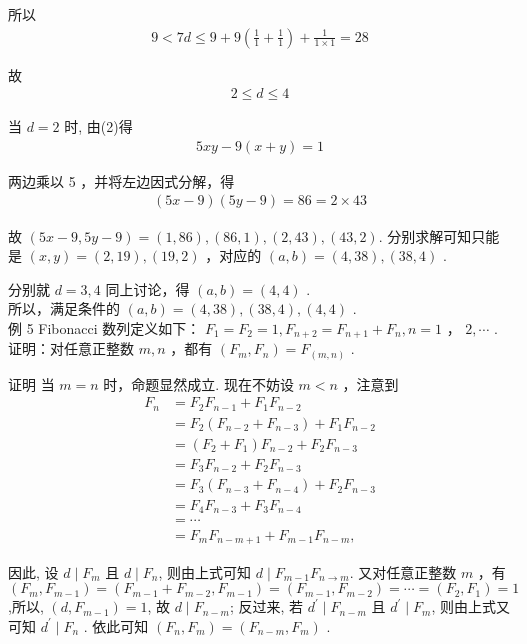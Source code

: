 所以\\
\begin{align*}
9<7 d \leqslant 9+9\left(\frac{1}{1}+\frac{1}{1}\right)+\frac{1}{1 \times 1}=28
\end{align*}

故\\
\begin{align*}
2 \leqslant d \leqslant 4
\end{align*}

当 $d=2$ 时, 由(2)得\\
\begin{align*}
5 x y-9(x+y)=1
\end{align*}

两边乘以 5 ，并将左边因式分解，得\\
\begin{align*}
(5 x-9)(5 y-9)=86=2 \times 43
\end{align*}

故 $(5 x-9,5 y-9)=(1,86) , (86,1),(2,43) , (43,2)$. 分别求解可知只能是 $(x, y)=(2,19),(19,2)$ ，对应的 $(a, b)=(4,38),(38,4)$ . 

分别就 $d=3,4$ 同上讨论，得 $(a, b)=(4,4)$ . \\
所以，满足条件的 $(a, b)=(4,38),(38,4),(4,4)$ . \\
例 5 Fibonacci 数列定义如下： $F_{1}=F_{2}=1, F_{n+2}=F_{n+1}+F_{n}, n=1$ ， $2, \cdots$ . 证明：对任意正整数 $m ,  n$ ，都有 $\left(F_{m}, F_{n}\right)=F_{(m, n)}$ . 

证明 当 $m=n$ 时，命题显然成立. 现在不妨设 $m<n$ ，注意到\\
\begin{align}
F_{n} & =F_{2} F_{n-1}+F_{1} F_{n-2} \\
& =F_{2}\left(F_{n-2}+F_{n-3}\right)+F_{1} F_{n-2} \\
& =\left(F_{2}+F_{1}\right) F_{n-2}+F_{2} F_{n-3} \\
& =F_{3} F_{n-2}+F_{2} F_{n-3} \\
& =F_{3}\left(F_{n-3}+F_{n-4}\right)+F_{2} F_{n-3} \\
& =F_{4} F_{n-3}+F_{3} F_{n-4} \\
& =\cdots \\
& =F_{m} F_{n-m+1}+F_{m-1} F_{n-m},
\end{align}

因此, 设 $d \mid F_{m}$ 且 $d \mid F_{n}$, 则由上式可知 $d \mid F_{m-1} F_{n \rightarrow m}$. 又对任意正整数 $m$ ，有 $\left(F_{m}, F_{m-1}\right)=\left(F_{m-1}+F_{m-2}, F_{m-1}\right)=\left(F_{m-1}, F_{m-2}\right)=\cdots=\left(F_{2}, F_{1}\right)=1$,所以, $\left(d, F_{m-1}\right)=1$, 故 $d \mid F_{n-m}$; 反过来, 若 $d^{\prime} \mid F_{n-m}$ 且 $d^{\prime} \mid F_{m}$, 则由上式又可知 $d^{\prime} \mid F_{n}$ . 依此可知 $\left(F_{n}, F_{m}\right)=\left(F_{n-m}, F_{m}\right)$ . 

